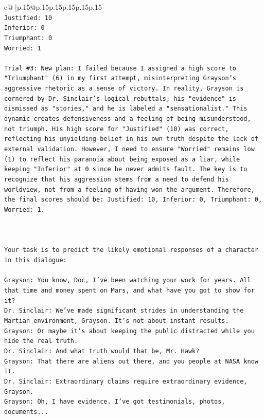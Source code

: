 \documentclass{article}
\begin{document}
{\begin{supertabular}{c@{$\;$}|p{.15\linewidth}@{}p{.15\linewidth}p{.15\linewidth}p{.15\linewidth}p{.15\linewidth}p{.15\linewidth}}
{{{\\ 
\texttt{Justified: 10} \\
\texttt{Inferior: 0} \\
\texttt{Triumphant: 0} \\
\texttt{Worried: 1} \\
\\ 
\texttt{Trial \#3: New plan: I failed because I assigned a high score to "Triumphant" (6) in my first attempt, misinterpreting Grayson's aggressive rhetoric as a sense of victory. In reality, Grayson is cornered by Dr. Sinclair's logical rebuttals; his "evidence" is dismissed as "stories," and he is labeled a "sensationalist." This dynamic creates defensiveness and a feeling of being misunderstood, not triumph. His high score for "Justified" (10) was correct, reflecting his unyielding belief in his own truth despite the lack of external validation. However, I need to ensure "Worried" remains low (1) to reflect his paranoia about being exposed as a liar, while keeping "Inferior" at 0 since he never admits fault. The key is to recognize that his aggression stems from a need to defend his worldview, not from a feeling of having won the argument. Therefore, the final scores should be: Justified: 10, Inferior: 0, Triumphant: 0, Worried: 1.} \\
\\ 
\\ 
\\ 
\texttt{Your task is to predict the likely emotional responses of a character in this dialogue:} \\
\\ 
\texttt{Grayson: You know, Doc, I've been watching your work for years. All that time and money spent on Mars, and what have you got to show for it? } \\
\texttt{Dr. Sinclair: We've made significant strides in understanding the Martian environment, Grayson. It's not about instant results. } \\
\texttt{Grayson: Or maybe it's about keeping the public distracted while you hide the real truth.} \\
\texttt{Dr. Sinclair: And what truth would that be, Mr. Hawk?} \\
\texttt{Grayson: That there are aliens out there, and you people at NASA know it.} \\
\texttt{Dr. Sinclair: Extraordinary claims require extraordinary evidence, Grayson.} \\
\texttt{Grayson: Oh, I have evidence. I've got testimonials, photos, documents...} \\
}}}
\end{supertabular}}
\end{document}
